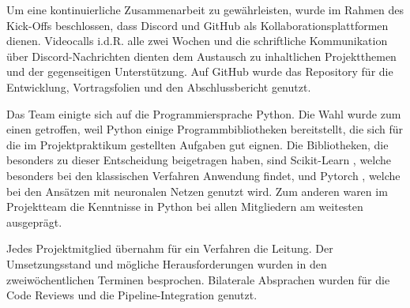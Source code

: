 Um eine kontinuierliche Zusammenarbeit zu gewährleisten, wurde im Rahmen des Kick-Offs beschlossen, dass Discord
und GitHub
als Kollaborationsplattformen dienen. Videocalls i.d.R. alle zwei Wochen und die schriftliche Kommunikation über Discord-Nachrichten dienten dem Austausch zu inhaltlichen Projektthemen und der gegenseitigen Unterstützung. Auf GitHub wurde das Repository \cite{Suxdorf2025Quality} für die Entwicklung, Vortragsfolien und den Abschlussbericht genutzt. %

\label{Programmiersprache}
Das Team einigte sich auf die Programmiersprache Python.
Die Wahl wurde zum einen getroffen, weil Python einige Programmbibliotheken bereitstellt, die sich für die im Projektpraktikum gestellten Aufgaben gut eignen. Die Bibliotheken, die besonders zu dieser Entscheidung beigetragen haben, sind Scikit-Learn \cite{Pedregosa2011}, welche besonders bei den klassischen Verfahren Anwendung findet, und Pytorch \cite{Ansel2024}, welche bei den Ansätzen mit neuronalen Netzen genutzt wird. Zum anderen waren im Projektteam die Kenntnisse in Python bei allen Mitgliedern am weitesten ausgeprägt.

Jedes Projektmitglied übernahm für ein Verfahren die Leitung. Der Umsetzungsstand und mögliche Herausforderungen wurden in den zweiwöchentlichen Terminen besprochen. Bilaterale Absprachen wurden für die Code Reviews und die Pipeline-Integration genutzt.

